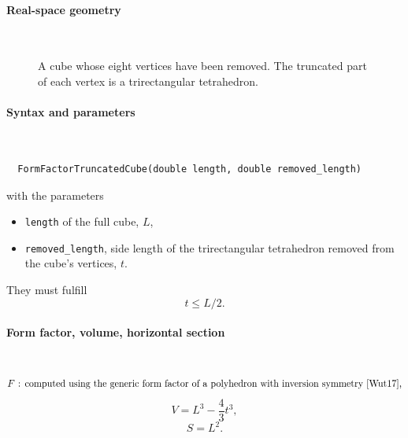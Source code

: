 \paragraph{Real-space geometry}\strut\\

\begin{figure}[H]
\hfill
{}
\hfill
{}
\hfill
{}
\hfill
\caption{A cube whose eight vertices have been removed.
The truncated part of each vertex is a trirectangular tetrahedron.}
\end{figure}

\FloatBarrier

\paragraph{Syntax and parameters}\strut\\[-2ex plus .2ex minus .2ex]
\begin{lstlisting}
  FormFactorTruncatedCube(double length, double removed_length)
\end{lstlisting}
with the parameters
\begin{itemize}
\item \texttt{length} of the full cube, $L$,
\item \texttt{removed\_length}, side length of the trirectangular tetrahedron removed from the cube's vertices, $t$.
\end{itemize}
They must fulfill
\begin{displaymath}
  t \le L/2.
\end{displaymath}

\paragraph{Form factor, volume, horizontal section}\strut\\
\begin{equation*}
  F \text{~: computed using the generic form factor of a polyhedron
             with inversion symmetry~\cite{Wut17},}
\end{equation*}
\begin{equation*}
  V = L^3 - \dfrac{4}{3}t^3,
\end{equation*}
\begin{equation*}
  S = L^2.
\end{equation*}

